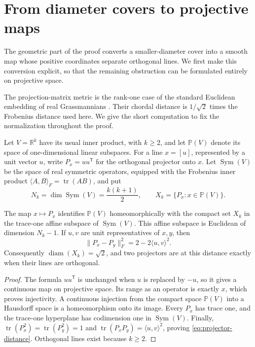 \section{From diameter covers to projective maps}
\label{sec:geometry}

The geometric part of the proof converts a smaller-diameter cover into a
smooth map whose positive coordinates separate orthogonal lines.  We first
make this conversion explicit, so that the remaining obstruction can be
formulated entirely on projective space.

The projection-matrix metric is the rank-one case of the standard
Euclidean embedding of real Grassmannians
\cite[Section~5, Theorem~2]{ConwayHardinSloane1996}. Their chordal
distance is $1/\sqrt2$ times the Frobenius distance used here. We give
the short computation to fix the normalization throughout the proof.

Let $V=\mathbb R^k$ have its usual inner product, with $k\geq2$, and let
$\mathbb P(V)$ denote its space of one-dimensional linear subspaces.
For a line $x=[u]$, represented by a unit vector $u$, write $P_x=uu^{\mathsf T}$
for the orthogonal projector onto $x$.  Let $\operatorname{Sym}(V)$ be the
space of real symmetric operators, equipped with the Frobenius inner product
$\langle A,B\rangle_F=\operatorname{tr}(AB)$, and put
\[
 N_k=\dim\operatorname{Sym}(V)=\frac{k(k+1)}2,
 \qquad X_k=\{P_x:x\in\mathbb P(V)\}.
\]

\begin{lemma}
\label{lem:projector-geometry}
The map $x\mapsto P_x$ identifies $\mathbb P(V)$ homeomorphically with the
compact set $X_k$ in the trace-one affine subspace of
$\operatorname{Sym}(V)$.  This affine subspace is Euclidean of dimension
$N_k-1$.  If $u,v$ are unit representatives of $x,y$, then
\begin{equation}
 \|P_x-P_y\|_F^2=2-2\langle u,v\rangle^2.
 \label{eq:projector-distance}
\end{equation}
Consequently $\operatorname{diam}(X_k)=\sqrt2$, and two projectors are at
this distance exactly when their lines are orthogonal.
\end{lemma}

\begin{proof}
The formula $uu^{\mathsf T}$ is unchanged when $u$ is replaced by $-u$,
so it gives a continuous map on projective space.  Its range as an operator
is exactly $x$, which proves injectivity.  A continuous injection from the
compact space $\mathbb P(V)$ into a Hausdorff space is a homeomorphism onto
its image.  Every $P_x$ has trace one, and the trace-one hyperplane has
codimension one in $\operatorname{Sym}(V)$.  Finally,
$\operatorname{tr}(P_x^2)=\operatorname{tr}(P_y^2)=1$ and
$\operatorname{tr}(P_xP_y)=\langle u,v\rangle^2$, proving
\eqref{eq:projector-distance}.  Orthogonal lines exist because $k\geq2$.
\end{proof}

